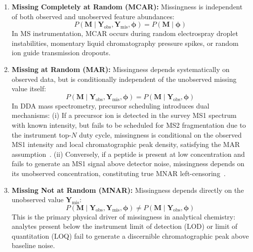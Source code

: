 \documentclass[11pt,oneside]{book}
\begin{document}
\begin{enumerate}
    \item \textbf{Missing Completely at Random (MCAR):} Missingness is independent of both observed and unobserved feature abundances:
    \begin{equation}
    P(\mathbf{M} \mid \mathbf{Y}_{\text{obs}}, \mathbf{Y}_{\text{mis}}, \boldsymbol{\phi}) = P(\mathbf{M} \mid \boldsymbol{\phi})
    \end{equation}
    In MS instrumentation, MCAR occurs during random electrospray droplet instabilities, momentary liquid chromatography pressure spikes, or random ion guide transmission dropouts.
    
    \item \textbf{Missing at Random (MAR):} Missingness depends systematically on observed data, but is conditionally independent of the unobserved missing value itself:
    \begin{equation}
    P(\mathbf{M} \mid \mathbf{Y}_{\text{obs}}, \mathbf{Y}_{\text{mis}}, \boldsymbol{\phi}) = P(\mathbf{M} \mid \mathbf{Y}_{\text{obs}}, \boldsymbol{\phi})
    \end{equation}
    In DDA mass spectrometry, precursor scheduling introduces dual mechanisms:
    (i) If a precursor ion is detected in the survey MS1 spectrum with known intensity, but fails to be scheduled for MS2 fragmentation due to the instrument top-$N$ duty cycle, missingness is conditional on the observed MS1 intensity and local chromatographic peak density, satisfying the MAR assumption~\cite{cox2014maxlfq}.
    (ii) Conversely, if a peptide is present at low concentration and fails to generate an MS1 signal above detector noise, missingness depends on its unobserved concentration, constituting true MNAR left-censoring~\cite{karpievitch2012normalization, lazar2016accounting}.
    
    \item \textbf{Missing Not at Random (MNAR):} Missingness depends directly on the unobserved value $\mathbf{Y}_{\text{mis}}$:
    \begin{equation}
    P(\mathbf{M} \mid \mathbf{Y}_{\text{obs}}, \mathbf{Y}_{\text{mis}}, \boldsymbol{\phi}) \ne P(\mathbf{M} \mid \mathbf{Y}_{\text{obs}}, \boldsymbol{\phi})
    \end{equation}
    This is the primary physical driver of missingness in analytical chemistry: analytes present below the instrument limit of detection (LOD) or limit of quantitation (LOQ) fail to generate a discernible chromatographic peak above baseline noise.
\end{enumerate}
\end{document}
